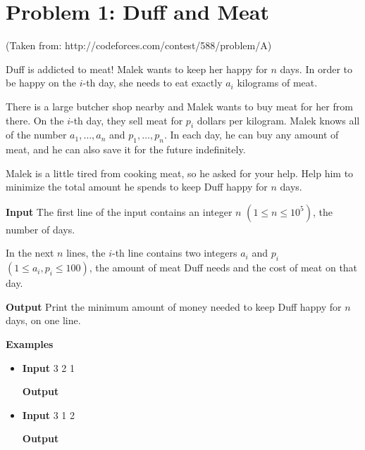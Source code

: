 \normalfont\documentclass[letterpaper,11pt]{article}
\begin{document}
\section*{Problem 1: Duff and Meat}
(Taken from: http://codeforces.com/contest/588/problem/A)

Duff is addicted to meat! Malek wants to keep her happy for $n$ days. In order to be happy on the $i$-th day, she needs to eat exactly $a_i$ kilograms of meat.

There is a large butcher shop nearby and Malek wants to buy meat for her from there. On the $i$-th day, they sell meat for $p_i$ dollars per kilogram. Malek knows all of the number $a_1, \ldots, a_n$ and $p_1, \ldots, p_n$. In each day, he can buy any amount of meat, and he can also save it for the future indefinitely.

Malek is a little tired from cooking meat, so he asked for your help. Help him to minimize the total amount he spends to keep Duff happy for $n$ days.

\textbf{Input} \newline
The first line of the input contains an integer $n$ $(1 \leq n \leq 10^5)$, the number of days.

In the next $n$ lines, the $i$-th line contains two integers $a_i$ and $p_i$ $(1 \leq a_i, p_i \leq 100)$, the amount of meat Duff needs and the cost of meat on that day.

\textbf{Output} \newline
Print the minimum amount of money needed to keep Duff happy for $n$ days, on one line. \newline

\textbf{Examples}
\begin{itemize}
\item \textbf{Input}   3  2  1

\textbf{Output} 

\item \textbf{Input}   3  1  2

\textbf{Output}  \newline
\end{itemize}
\end{document}
